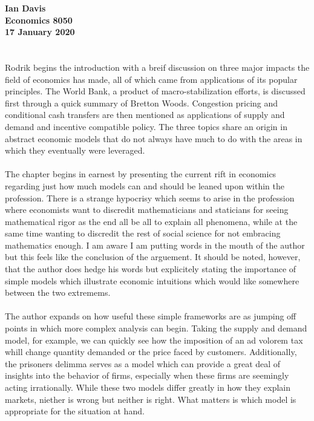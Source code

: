 
\let\counterwithout\relax
\let\counterwithin\relax
{}


\noindent \textbf{Ian Davis}\\
\noindent \textbf{Economics 8050}\\
\noindent \textbf{17 January 2020}\\
\\
\\
\indent Rodrik begins the introduction with a breif discussion on three major impacts the field of economics has made, all of which came from applications of its popular principles. The World Bank, a product of macro-stabilization efforts, is discussed first through a quick summary of Bretton Woods. Congestion pricing and conditional cash transfers are then mentioned as applications of supply and demand and incentive compatible policy. The three topics share an origin in abstract economic models that do not always have much to do with the areas in which they eventually were leveraged.\\
\\
\indent The chapter begins in earnest by presenting the current rift in economics regarding just how much models can and should be leaned upon within the profession. There is a strange hypocrisy which seems to arise in the profession where economists want to discredit mathematicians and staticians for seeing mathematical rigor as the end all be all to explain all phenomena, while at the same time wanting to discredit the rest of social science for not embracing mathematics enough. I am aware I am putting words in the mouth of the author but this feels like the conclusion of the arguement. It should be noted, however, that the author does hedge his words but explicitely stating the importance of simple models which illustrate economic intuitions which would like somewhere between the two extremems.\\
\\
\indent The author expands on how useful these simple frameworks are as jumping off points in which more complex analysis can begin. Taking the supply and demand model, for example, we can quickly see how the imposition of an ad volorem tax whill change quantity demanded or the price faced by customers. Additionally, the prisoners delimma serves as a model which can provide a great deal of insights into the behavior of firms, especially when these firms are seemingly acting irrationally. While these two models differ greatly in how they explain markets, niether is wrong but neither is right. What matters is which model is appropriate for the situation at hand.\\
